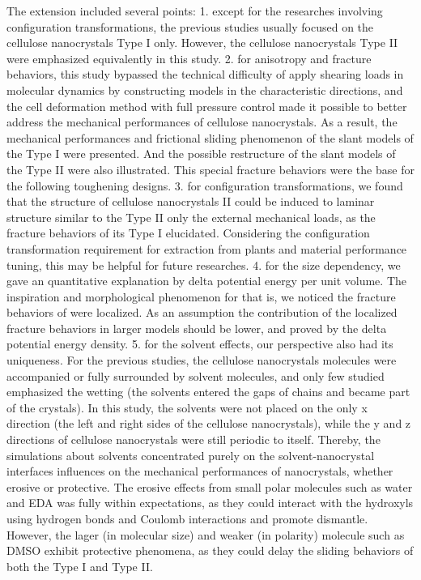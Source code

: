 \documentclass{article}
\begin{document}
The extension included several points:
1. except for the researches involving configuration transformations, the previous studies usually focused on the cellulose nanocrystals Type I only.
However, the cellulose nanocrystals Type II were emphasized equivalently in this study.
2. for anisotropy and fracture behaviors, this study bypassed the technical difficulty of apply shearing loads in molecular dynamics by constructing models in the characteristic directions, and the cell deformation method with full pressure control made it possible to better address the mechanical performances of cellulose nanocrystals.
As a result, the mechanical performances and frictional sliding phenomenon of the slant models of the Type I were presented.
And the possible restructure of the slant models of the Type II were also illustrated.
This special fracture behaviors were the base for the following toughening designs.
3. for configuration transformations, we found that the structure of cellulose nanocrystals II could be induced to laminar structure similar to the Type II only the external mechanical loads, as the fracture behaviors of its Type I elucidated.
Considering the configuration transformation requirement for extraction from plants and material performance tuning, this may be helpful for future researches.
4. for the size dependency, we gave an quantitative explanation by delta potential energy per unit volume.
The inspiration and morphological phenomenon for that is, we noticed the fracture behaviors of were localized.
As an assumption the contribution of the localized fracture behaviors in larger models should be lower, and proved by the delta potential energy density.
5. for the solvent effects, our perspective also had its uniqueness.
For the previous studies, the cellulose nanocrystals molecules were accompanied or fully surrounded by solvent molecules, and only few studied emphasized the wetting (the solvents entered the gaps of chains and became part of the crystals)\cite{malaspina2019molecular,uto2019molecular}.
In this study, the solvents were not placed on the only x direction (the left and right sides of the cellulose nanocrystals), while the y and z directions of cellulose nanocrystals were still periodic to itself.
Thereby, the simulations about solvents concentrated purely on the solvent-nanocrystal interfaces influences on the mechanical performances of nanocrystals, whether erosive or protective.
The erosive effects from small polar molecules such as water and EDA was fully within expectations, as they could interact with the hydroxyls using hydrogen bonds and Coulomb interactions and promote dismantle.
However, the lager (in molecular size) and weaker (in polarity) molecule such as DMSO exhibit protective phenomena, as they could delay the sliding behaviors of both the Type I and Type II.
\end{document}
